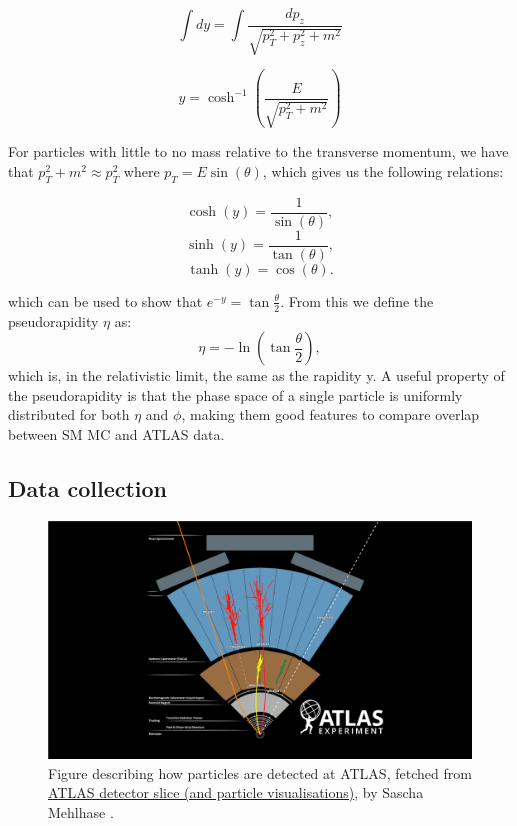 \begin{equation*}
    \int dy = \int \frac{dp_z}{\sqrt{p_T^2 + p_z^2 + m^2}}
\end{equation*}

\begin{equation}
    y = \cosh^{-1}\left( \frac{E}{\sqrt{p_T^2 + m^2}}\right)
\end{equation}

For particles with little to no mass relative to the transverse momentum, we have that $p_T^2 + m^2 \approx p_T^2$ 
where $p_T = E\sin{(\theta)}$, which gives us the following relations:

\begin{equation*}
    \cosh(y) = \frac{1}{\sin(\theta)},
\end{equation*}
\begin{equation*}
    \sinh(y) = \frac{1}{\tan(\theta)},
\end{equation*}
\begin{equation*}
    \tanh(y) = \cos(\theta).
\end{equation*}

which can be used to show that $e^{-y} = \tan{\frac{\theta}{2}}$. From this we define the pseudorapidity $\eta$ as:
\begin{equation}
    \eta = -\ln{\left( \tan{\frac{\theta}{2}}\right)},
\end{equation}
which is, in the relativistic limit, the same as the rapidity y. A useful property of the pseudorapidity is that 
the phase space of a single particle is uniformly distributed for both $\eta$ and $\phi$, making them good features 
to compare overlap between SM MC and ATLAS data\cite{Gramstad:1631043}. 
\subsection*{Data collection}

\begin{figure}[H]
    \includegraphics[width=\linewidth]{Figures/atlas/ATLAS Detector Schematic black particles.png}
    \caption[Detector tracking of particles]{Figure describing how particles are detected at ATLAS, fetched from \href{https://cds.cern.ch/record/2770815}{	ATLAS detector slice (and particle visualisations)}, by Sascha Mehlhase \cite{Mehlhase:2770815} . }
    \label{fig:atlas_particle_detect}
\end{figure}

